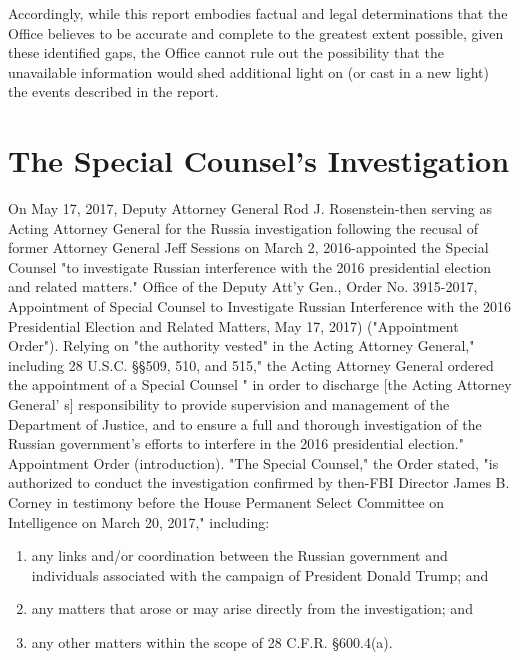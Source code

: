 \documentclass{article}
\begin{document}
Accordingly, while this report embodies factual and legal determinations that the Office believes to be accurate and complete to the greatest extent possible, given these identified gaps, the Office cannot rule out the possibility that the unavailable information would shed additional light on (or cast in a new light) the events described in the report.

\section{The Special Counsel's Investigation}

On May 17, 2017, Deputy Attorney General Rod J. Rosenstein-then serving as Acting Attorney General for the Russia investigation following the recusal of former Attorney General Jeff Sessions on March 2, 2016-appointed the Special Counsel "to investigate Russian interference with the 2016 presidential election and related matters."
Office of the Deputy Att'y Gen., Order No. 3915-2017, Appointment of Special Counsel to Investigate Russian Interference with the 2016 Presidential Election and Related Matters, May 17, 2017) ("Appointment Order").
Relying on "the authority vested" in the Acting Attorney General," including 28 U.S.C. \S\S 509, 510, and 515," the Acting Attorney General ordered the appointment of a Special Counsel " in order to discharge [the Acting Attorney General' s] responsibility to provide supervision and management of the Department of Justice, and to ensure a full and thorough investigation of the Russian government's efforts to interfere in the 2016 presidential election." Appointment Order (introduction).
"The Special Counsel," the Order stated, "is authorized to conduct the investigation confirmed by then-FBI Director James B. Corney in testimony before the House Permanent Select Committee on Intelligence on March 20, 2017," including:

\begin{enumerate}[i]
  \item any links and/or coordination between the Russian government and individuals associated with the campaign of President Donald Trump; and
  \item any matters that arose or may arise directly from the investigation; and
  \item any other matters within the scope of 28 C.F.R. \S 600.4(a).
\end{enumerate}
\end{document}
